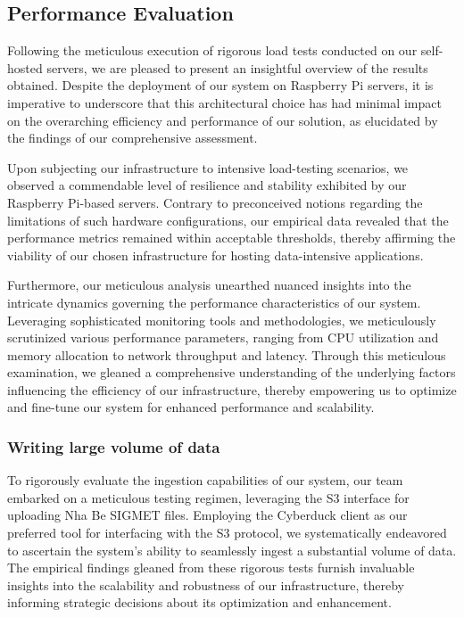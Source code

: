 \subsection{Performance Evaluation}
Following the meticulous execution of rigorous load tests conducted on our
self-hosted servers, we are pleased to present an insightful overview of the
results obtained. Despite the deployment of our system on Raspberry Pi servers,
it is imperative to underscore that this architectural choice has had minimal
impact on the overarching efficiency and performance of our solution, as
elucidated by the findings of our comprehensive assessment.

Upon subjecting our infrastructure to intensive load-testing scenarios, we
observed a commendable level of resilience and stability exhibited by our
Raspberry Pi-based servers. Contrary to preconceived notions regarding the
limitations of such hardware configurations, our empirical data revealed that
the performance metrics remained within acceptable thresholds, thereby affirming
the viability of our chosen infrastructure for hosting data-intensive
applications.

Furthermore, our meticulous analysis unearthed nuanced insights into the
intricate dynamics governing the performance characteristics of our system.
Leveraging sophisticated monitoring tools and methodologies, we meticulously
scrutinized various performance parameters, ranging from CPU utilization and
memory allocation to network throughput and latency. Through this meticulous
examination, we gleaned a comprehensive understanding of the underlying factors
influencing the efficiency of our infrastructure, thereby empowering us to
optimize and fine-tune our system for enhanced performance and scalability.

\subsubsection{Writing large volume of data}

To rigorously evaluate the ingestion capabilities of our system, our team
embarked on a meticulous testing regimen, leveraging the S3 interface for
uploading Nha Be SIGMET files. Employing the Cyberduck client as our preferred
tool for interfacing with the S3 protocol, we systematically endeavored to
ascertain the system's ability to seamlessly ingest a substantial volume of
data. The empirical findings gleaned from these rigorous tests furnish
invaluable insights into the scalability and robustness of our infrastructure,
thereby informing strategic decisions about its optimization and enhancement.

